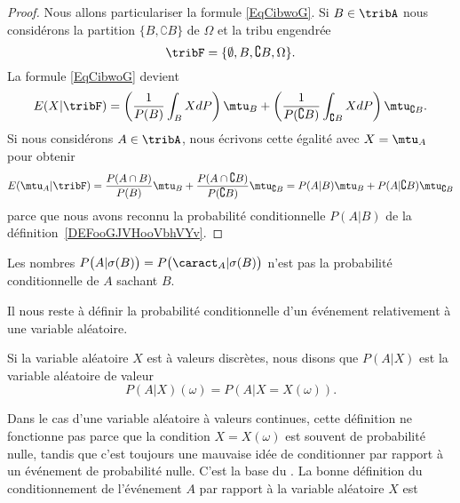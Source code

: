 \begin{proof}
    Nous allons particulariser la formule \eqref{EqCibwoG}. Si \( B\in \tribA\) nous considérons la partition \( \{ B,\complement B \}\) de \( \Omega\) et la tribu engendrée
    \begin{equation}
        \tribF=\{ \emptyset,B,\complement B,\Omega \}.
    \end{equation}
    La formule \eqref{EqCibwoG} devient
    \begin{equation}
        E(X|\tribF)=\left( \frac{1}{ P(B) }\int_BXdP \right)\mtu_B+\left( \frac{1}{ P(\complement B) }\int_{\complement B}XdP \right)\mtu_{\complement B}.
    \end{equation}
    Si nous considérons \( A\in\tribA\), nous écrivons cette égalité avec \( X=\mtu_A\) pour obtenir
    \begin{equation}
            E(\mtu_A|\tribF)=\frac{ P(A\cap B) }{ P(B) }\mtu_B+\frac{ P(A\cap\complement B) }{ P(\complement B) }\mtu_{\complement B} =P(A|B)\mtu_B+P(A|\complement B)\mtu_{\complement B}
    \end{equation}
    parce que nous avons reconnu la probabilité conditionnelle \( P(A|B)\) de la définition~\ref{DEFooGJVHooVbhVYv}.
\end{proof}

\begin{remark}
    Les nombres \(P\big( A |\sigma(B) \big)=P\big(\caract_A|\sigma(B)\big)\) n'est pas la probabilité conditionnelle de \( A\) sachant \( B\).
\end{remark}



Il nous reste à définir la probabilité conditionnelle d'un événement relativement à une variable aléatoire.

\begin{definition}      \label{DEFooFRLFooNvXuPK}
    Si la variable aléatoire \( X\) est à valeurs discrètes, nous disons que \( P(A|X)\) est la variable aléatoire de valeur
    \begin{equation}
        P(A|X)(\omega)=P(A|X=X(\omega)).
    \end{equation}
\end{definition}
Dans le cas d'une variable aléatoire à valeurs continues, cette définition ne fonctionne pas parce que la condition \( X=X(\omega)\) est souvent de probabilité nulle, tandis que c'est toujours une mauvaise idée de conditionner par rapport à un événement de probabilité nulle. C'est la base du . La bonne définition du conditionnement de l'événement \( A\) par rapport à la variable aléatoire $X$ est

